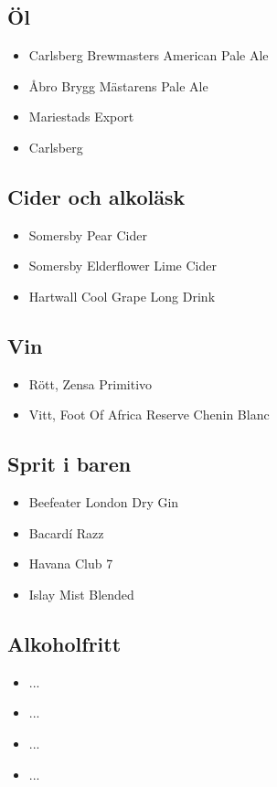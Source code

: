 \documentclass[a5paper]{article}
\begin{document}
	\subsection*{Öl}
	\vspace{-0.2cm}
	\begin{itemize}
		\item Carlsberg Brewmasters American Pale Ale
		\item Åbro Brygg Mästarens Pale Ale 
		\item Mariestads Export
		\item Carlsberg
	\end{itemize}

	\subsection*{Cider och alkoläsk}
	\vspace{-0.2cm}
	\begin{itemize}
		\item Somersby Pear Cider
		\item Somersby Elderflower Lime Cider
		\item Hartwall Cool Grape Long Drink
	\end{itemize}
	 
		
	\subsection*{Vin}
	\vspace{-0.2cm}
	\begin{itemize}
		\item Rött, Zensa Primitivo 
		\item Vitt, Foot Of Africa Reserve Chenin Blanc 
	\end{itemize}

	\subsection*{Sprit i baren}
	\vspace{-0.2cm}
	\begin{itemize}
		\item Beefeater London Dry Gin
		\item Bacardí Razz
		\item Havana Club 7 
		\item Islay Mist Blended
	\end{itemize}

	
	\subsection*{Alkoholfritt}
	\vspace{-0.2cm}
	\begin{itemize}
		\item ... 
		\item ... 
		\item ... 
		\item ...
	\end{itemize}
	
\end{document}
